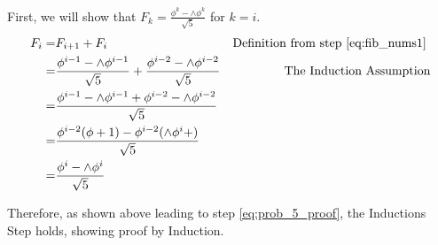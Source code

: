 \documentclass[11pt,letterpaper]{article}
\begin{document}
First, we will show that $ F_k = \frac{ \phi^k - \wedge\phi^k }{ \sqrt{5} } $ for $k = i$.
\begin{eqnarray}
	F_i = 	& F_{i+1} + F_i 		
		&	\mbox{Definition from step \ref{eq:fib_nums1} } \\
	     =		& \frac{ \phi^{i-1} - \wedge\phi^{i-1} }{ \sqrt{5} } + \frac{ \phi^{i-2} - \wedge\phi^{i-2} }
			{ \sqrt{5} }
				&	\mbox{The Induction Assumption} \\
	     =		& \frac{ 
				\phi^{i-1} - \wedge\phi^{i-1} + \phi^{i-2} - \wedge\phi^{i-2} }
				{ \sqrt{5} }
				& \\
	     =		& \frac{ 
				\phi^{i-2}(\phi + 1) - \phi^{i-2}( \wedge\phi^{i} + ) }
				{ \sqrt{5} }
				& \\
	     =		& \frac{ \phi^i - \wedge\phi^i }{ \sqrt{5} }
				& \label{eq:prob_5_proof} \\
\end{eqnarray}

Therefore, as shown above leading to step \ref{eq:prob_5_proof}, the Inductions Step holds, showing proof by Induction.
\end{document}
